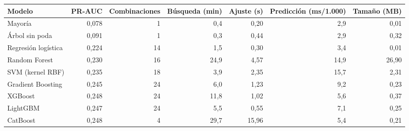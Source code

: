 \begin{tabular}{lrrrrrr}
\toprule
Modelo & PR-AUC & Combinaciones & Búsqueda (min) & Ajuste (s) & Predicción (ms/1.000) & Tamaño (MB) \\
\midrule
Mayoría & 0{,}078 & 1 & 0{,}4 & 0{,}20 & 2{,}9 & 0{,}01 \\
Árbol sin poda & 0{,}091 & 1 & 0{,}3 & 0{,}44 & 2{,}9 & 0{,}32 \\
Regresión logística & 0{,}224 & 14 & 1{,}5 & 0{,}30 & 3{,}4 & 0{,}01 \\
Random Forest & 0{,}230 & 16 & 24{,}9 & 4{,}57 & 14{,}9 & 26{,}90 \\
SVM (kernel RBF) & 0{,}235 & 18 & 3{,}9 & 2{,}35 & 15{,}7 & 2{,}31 \\
Gradient Boosting & 0{,}245 & 24 & 6{,}0 & 1{,}23 & 9{,}2 & 0{,}23 \\
XGBoost & 0{,}248 & 24 & 11{,}8 & 1{,}02 & 5{,}6 & 0{,}37 \\
LightGBM & 0{,}247 & 24 & 5{,}5 & 0{,}55 & 7{,}1 & 0{,}25 \\
CatBoost & 0{,}248 & 4 & 29{,}7 & 15{,}96 & 5{,}4 & 0{,}21 \\
\bottomrule
\end{tabular}
